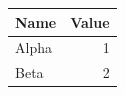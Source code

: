 \documentclass{article}
\begin{document}
\begin{tabular}{|l|r|}
\hline
\rowcolor{cyan!20} Name & Value \\ \hline
Alpha & \cellcolor{yellow!40} 1 \\ \hline
\arrayrulecolor{magenta} Beta & 2 \\ \hline
\end{tabular}
\end{document}
